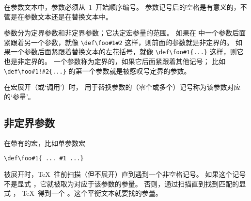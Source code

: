 \documentclass[letterpaper]{book}
\begin{document}
在参数文本中，参数必须从~1~开始顺序编号。
参数记号后的空格是有意义的，不管是在参数文本还是在替换文本中。

参数分为定界参数和非定界参数；它决定宏参量的范围。
如果在  中一个参数后面紧跟着另一个参数，就像
\verb+\def\foo#1#2+ 这样，则前面的参数就是非定界的。
如果一个参数后面紧跟着替换文本的左花括号，就像
\verb+\def\foo#1{...}+ 这样，则它也是非定界的。
一个参数称为定界的，如果它后面紧跟着其他记号；
比如 \verb+\def\foo#1!#2{...}+ 的第一个参数就是被感叹号定界的参数。

在宏展开（或`调用'）时，
用于替换参数的（零个或多个）记号称为该参数对应的`参量'。

\subsection{非定界参数}

在带有的宏，比如单参数宏 
\begin{verbatim}
\def\foo#1{ ... #1 ...}
\end{verbatim}
被展开时，\TeX\ 往前扫描（但不展开）直到遇到一个非空格记号。
如果这个记号不是显式 ，它就被取为对应于该参数的参量。
否则，通过扫描直到找到匹配的显式 ，
\TeX\ 得到一个 。这个平衡文本就要找的参量。
\end{document}
